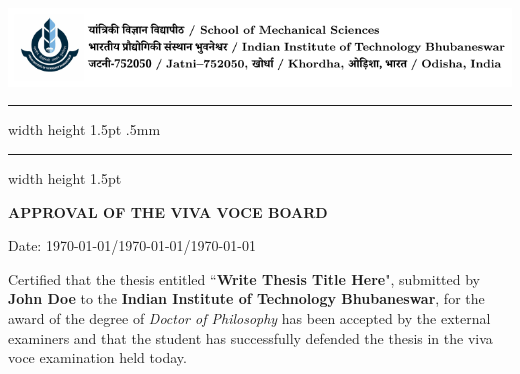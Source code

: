 
\chapter*{}
\vspace*{-5cm}

{\centering \includegraphics[width=\linewidth, scale=1]{iitbbs_letterhead}}
{\hrule width \hsize height 1.5pt \kern .5mm \hrule width \hsize height 1.5pt}

\vspace{2ex}
\begin{center}
    \textbf{\Large APPROVAL OF THE VIVA VOCE BOARD}
\end{center}

\begin{flushright}
    Date: \thisdate\today/\thismonthdigit\today/\thisyear\today
\end{flushright}

\par Certified that the thesis entitled ``\textbf{Write Thesis Title Here}", submitted by \textbf{John Doe} to the \textbf{Indian Institute of Technology Bhubaneswar}, for the award of the degree of \textit{Doctor of Philosophy} has been accepted by the external examiners and that the student has successfully defended the thesis in the viva voce examination held today.

